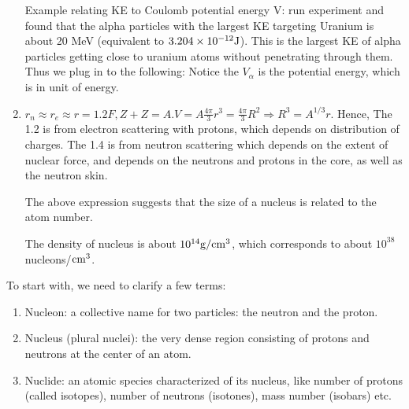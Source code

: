 \documentclass{school-22.101-notes}
\begin{document}
\begin{enumerate}
Example relating KE to Coulomb potential energy V: run experiment and found that the alpha particles with the largest KE targeting Uranium is about 20 MeV (equivalent to $3.204 \times 10^{-12} \mathrm{J}$). This is the largest KE of alpha particles getting close to uranium atoms without penetrating through them. Thus we plug in to the following: 
Notice the $V_\alpha$ is the potential energy, which is in unit of energy. 


\item $r_n \approx r_e \approx r = 1.2 F, Z + Z = A. V = A \frac{4\pi}{3} r^3 = \frac{4 \pi}{3} R^2 \Rightarrow R^3 = A^{1/3} r.$ Hence,
The 1.2 is from electron scattering with protons, which depends on distribution of charges. The 1.4 is from neutron scattering which depends on the extent of nuclear force, and depends on the neutrons and protons in the core, as well as the neutron skin. 

The above expression suggests that the size of a nucleus is related to the atom number. 

The density of nucleus is about $10^{14} \mathrm{g}/\mathrm{cm}^3$, which corresponds to about $10^{38} $ nucleons/$\mathrm{cm}^3$. 


\end{enumerate}


To start with, we need to clarify a few terms:
\begin{enumerate}
\item Nucleon: a collective name for two particles: the neutron and the proton. 
\item Nucleus (plural nuclei): the very dense region consisting of protons and neutrons at the center of an atom.
\item Nuclide: an atomic species characterized of its nucleus, like number of protons (called isotopes), number of neutrons (isotones), mass number (isobars) etc. 
\end{enumerate}
\end{document}
